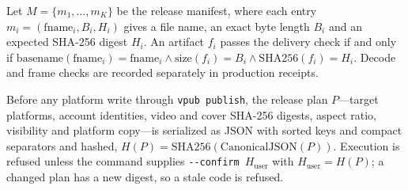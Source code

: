 \begin{invariant}
Let $M = \{m_1, \dots, m_K\}$ be the release manifest, where each entry $m_i = (\text{fname}_i, B_i, H_i)$ gives a file name, an exact byte length $B_i$ and an expected SHA-256 digest $H_i$. An artifact $f_i$ passes the delivery check if and only if $\text{basename}(\text{fname}_i) = \text{fname}_i \land \text{size}(f_i) = B_i \land \text{SHA256}(f_i) = H_i$. Decode and frame checks are recorded separately in production receipts.
\end{invariant}

\begin{invariant}
Before any platform write through \texttt{vpub publish}, the release plan $P$---target platforms, account identities, video and cover SHA-256 digests, aspect ratio, visibility and platform copy---is serialized as JSON with sorted keys and compact separators and hashed, $H(P) = \text{SHA256}(\text{CanonicalJSON}(P))$. Execution is refused unless the command supplies \texttt{-{}-confirm}~$H_{\text{user}}$ with $H_{\text{user}} = H(P)$; a changed plan has a new digest, so a stale code is refused.
\end{invariant}
